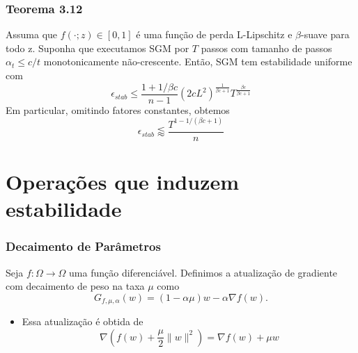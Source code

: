 \documentclass{beamer}
\newcommand{\EE}{\mathbb{E}}
\begin{document}
\begin{frame}
\frametitle{Teorema 3.12}
\begin{theorem}[3.12]
Assuma que \(f(\cdot;z) \in [0,1]\) é uma função de perda L-Lipschitz e \(\beta\)-suave para todo z.  Suponha que executamos SGM por $T$ passos com tamanho de passos $\alpha_t \le c/t$ monotonicamente não-crescente.
Então, SGM tem estabilidade uniforme com
$$ \epsilon_{stab} \le \frac{1+1/\beta c}{n-1}(2cL^2)^{\frac{1}{\beta c+1}}T^{\frac{\beta c}{\beta c+1}} $$ 
Em particular, omitindo fatores constantes, obtemos
$$ \epsilon_{stab} \lessapprox  \frac{T^{1-1/(\beta c+1)}}{n} $$ 
\end{theorem}
\end{frame}



\section{Operações que induzem estabilidade}
\begin{frame}
\tableofcontents[currentsection]
\end{frame}

\begin{frame}
\frametitle{Decaimento de Parâmetros}
\begin{definition}[4.1]
Seja \(f:\Omega \rightarrow \Omega\) uma função diferenciável. Definimos a atualização de gradiente com decaimento de peso na taxa \(\mu\) como
$$ G_{f,\mu,\alpha}(w) = (1-\alpha\mu)w - \alpha\nabla f(w). $$ 
\end{definition}

\begin{itemize}
    \item 
    Essa atualização é obtida de $$\nabla\left(f(w) + \frac{\mu}{2}\|w\|^2\right) = \nabla f(w) + \mu w$$
\end{itemize}
\end{frame}
\end{document}
